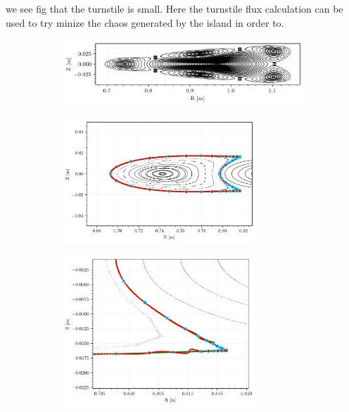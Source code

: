 we see fig that the turnstile is small. Here the turnstile flux calculation can be used to try minize the chaos generated by the island in order to.

\begin{figure}[H]
    \centering
    \begin{subfigure}[t]{\textwidth}
        \centering
        \includegraphics[width=\textwidth]{images/quasrs/poincare_1329594.png}
        \caption{}
        \label{fig:p-1329594}
    \end{subfigure}
    \begin{subfigure}[t]{0.49\textwidth}
        \centering
        \includegraphics[width=0.8\textwidth]{images/quasrs/homoclinics_1329594.png}
        \caption{}
        \label{fig:manifold-1329594}
    \end{subfigure}
    \hfill
    \begin{subfigure}[t]{0.49\textwidth}
        \centering
        \includegraphics[width=0.8\textwidth]{images/quasrs/homoclinics_1329594_cu.png}

\end{subfigure}
\end{figure}
